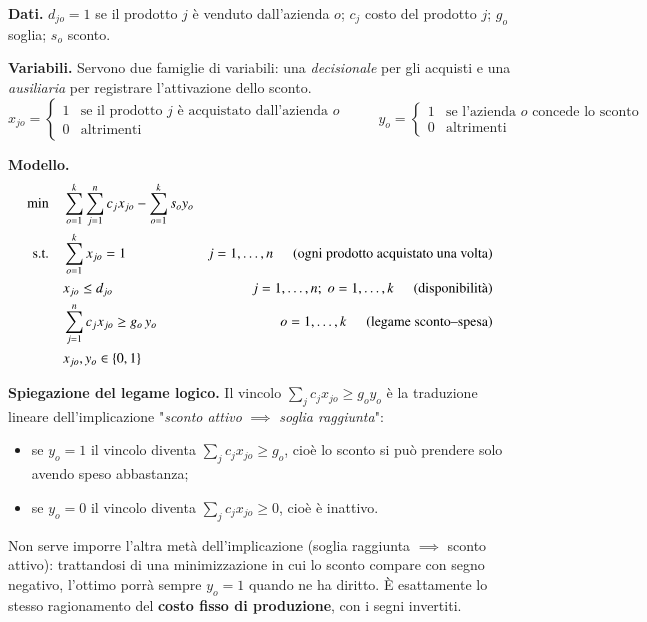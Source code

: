 \documentclass[12pt]{extarticle} %
\begin{document}
\noindent\textbf{Dati.} $d_{jo} = 1$ se il prodotto $j$ è venduto dall'azienda $o$; $c_j$ costo del prodotto $j$; $g_o$ soglia; $s_o$ sconto.

\noindent\textbf{Variabili.} Servono due famiglie di variabili: una \textit{decisionale} per gli acquisti e una \textit{ausiliaria} per registrare l'attivazione dello sconto.
\[
x_{jo} = \begin{cases} 1 & \text{se il prodotto } j \text{ è acquistato dall'azienda } o\\ 0 & \text{altrimenti}\end{cases}
\hspace{1cm}
y_o = \begin{cases} 1 & \text{se l'azienda } o \text{ concede lo sconto}\\ 0 & \text{altrimenti}\end{cases}
\]

\noindent\textbf{Modello.}
\[
\begin{aligned}
\min \quad & \sum_{o=1}^k \sum_{j=1}^n c_j x_{jo} - \sum_{o=1}^k s_o y_o \\
\text{s.t.} \quad & \sum_{o=1}^k x_{jo} = 1 & j=1,\dots,n \hspace{0.5cm}\text{(ogni prodotto acquistato una volta)}\\
& x_{jo} \le d_{jo} & j=1,\dots,n; \; o=1,\dots,k \hspace{0.5cm}\text{(disponibilità)}\\
& \sum_{j=1}^n c_j x_{jo} \ge g_o\, y_o & o=1,\dots,k \hspace{0.5cm}\text{(legame sconto--spesa)}\\
& x_{jo}, y_o \in \{0,1\}
\end{aligned}
\]

\noindent\textbf{Spiegazione del legame logico.} Il vincolo $\sum_j c_j x_{jo} \ge g_o y_o$ è la traduzione lineare dell'implicazione "\textit{sconto attivo} $\implies$ \textit{soglia raggiunta}":
\begin{itemize}
    \item se $y_o = 1$ il vincolo diventa $\sum_j c_j x_{jo} \ge g_o$, cioè lo sconto si può prendere solo avendo speso abbastanza;
    \item se $y_o = 0$ il vincolo diventa $\sum_j c_j x_{jo} \ge 0$, cioè è inattivo.
\end{itemize}
Non serve imporre l'altra metà dell'implicazione (soglia raggiunta $\implies$ sconto attivo): trattandosi di una minimizzazione in cui lo sconto compare con segno negativo, l'ottimo porrà sempre $y_o=1$ quando ne ha diritto. È esattamente lo stesso ragionamento del \textbf{costo fisso di produzione}, con i segni invertiti.
\end{document}
